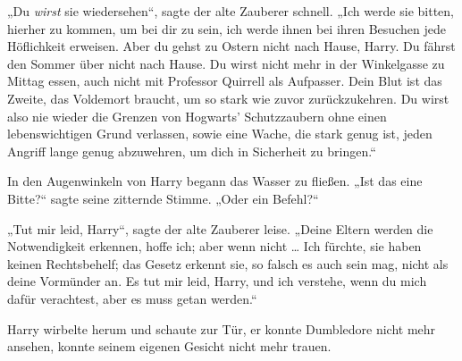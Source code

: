 „Du \emph{wirst} sie wiedersehen“, sagte der alte Zauberer schnell.
„Ich werde sie bitten, hierher zu kommen, um bei dir zu sein, ich werde ihnen bei ihren Besuchen jede Höflichkeit erweisen. Aber du gehst zu Ostern nicht nach Hause, Harry. Du fährst den Sommer über nicht nach Hause. Du wirst nicht mehr in der Winkelgasse zu Mittag essen, auch nicht mit Professor Quirrell als Aufpasser. Dein Blut ist das Zweite, das Voldemort braucht, um so stark wie zuvor zurückzukehren. Du wirst also nie wieder die Grenzen von Hogwarts’ Schutzzaubern ohne einen lebenswichtigen Grund verlassen, sowie eine Wache, die stark genug ist, jeden Angriff lange genug abzuwehren, um dich in Sicherheit zu bringen.“

In den Augenwinkeln von Harry begann das Wasser zu fließen.
„Ist das eine Bitte?“ sagte seine zitternde Stimme.
„Oder ein Befehl?“

„Tut mir leid, Harry“, sagte der alte Zauberer leise.
„Deine Eltern werden die Notwendigkeit erkennen, hoffe ich; aber wenn nicht … Ich fürchte, sie haben keinen Rechtsbehelf; das Gesetz erkennt sie, so falsch es auch sein mag, nicht als deine Vormünder an. Es tut mir leid, Harry, und ich verstehe, wenn du mich dafür verachtest, aber es muss getan werden.“

Harry wirbelte herum und schaute zur Tür, er konnte Dumbledore nicht mehr ansehen, konnte seinem eigenen Gesicht nicht mehr trauen.

